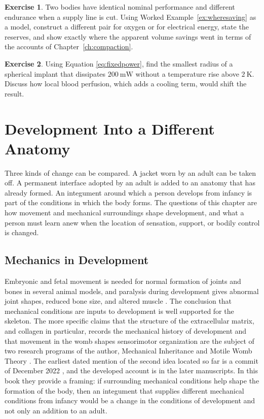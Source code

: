 \documentclass[11pt,openany]{book}
\theoremstyle{definition}
\newtheorem{exercise}{Exercise}[chapter]
\theoremstyle{remark}
\begin{document}
\begin{exercise}
Two bodies have identical nominal performance and different endurance when a supply line is cut. Using Worked Example~\ref{ex:wheresaving} as a model, construct a different pair for oxygen or for electrical energy, state the reserves, and show exactly where the apparent volume savings went in terms of the accounts of Chapter~\ref{ch:compaction}.
\end{exercise}

\begin{exercise}
Using Equation \eqref{eq:fixedpower}, find the smallest radius of a spherical implant that dissipates $200\ \mathrm{mW}$ without a temperature rise above $2\ \mathrm{K}$. Discuss how local blood perfusion, which adds a cooling term, would shift the result.
\end{exercise}

\chapter{Development Into a Different Anatomy}
\label{ch:development}

Three kinds of change can be compared. A jacket worn by an adult can be taken off. A permanent interface adopted by an adult is added to an anatomy that has already formed. An integument around which a person develops from infancy is part of the conditions in which the body forms. The questions of this chapter are how movement and mechanical surroundings shape development, and what a person must learn anew when the location of sensation, support, or bodily control is changed.

\section{Mechanics in Development}

Embryonic and fetal movement is needed for normal formation of joints and bones in several animal models, and paralysis during development gives abnormal joint shapes, reduced bone size, and altered muscle \cite{pitsillides2006,nowlan2010}. The conclusion that mechanical conditions are inputs to development is well supported for the skeleton. The more specific claims that the structure of the extracellular matrix, and collagen in particular, records the mechanical history of development and that movement in the womb shapes sensorimotor organization are the subject of two research programs of the author, Mechanical Inheritance and Motile Womb Theory \cite{flyxion2026mi,flyxion2026mwt,flyxion2022mwt}. The earliest dated mention of the second idea located so far is a commit of December 2022 \cite{flyxion2022mwt}, and the developed account is in the later manuscripts. In this book they provide a framing: if surrounding mechanical conditions help shape the formation of the body, then an integument that supplies different mechanical conditions from infancy would be a change in the conditions of development and not only an addition to an adult.
\end{document}
